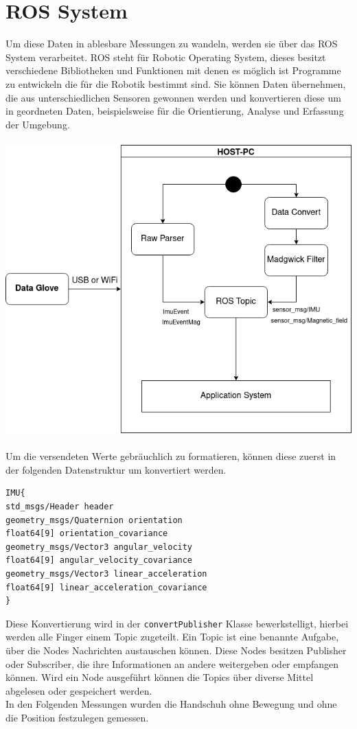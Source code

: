 \section{ROS System}
Um diese Daten in ablesbare Messungen zu wandeln, werden sie über das ROS System verarbeitet. ROS steht für Robotic Operating System, dieses besitzt verschiedene Bibliotheken und Funktionen mit denen es möglich ist Programme zu entwickeln die für die Robotik bestimmt sind. 
Sie können Daten übernehmen, die aus unterschiedlichen Sensoren gewonnen werden und konvertieren diese um in geordneten Daten, beispielsweise für die Orientierung, Analyse und Erfassung der Umgebung. 
\\
\\
\includegraphics[width=0.7\columnwidth]{Bachelorarbeit/images/Host-Architektur.drawio.png}
\\
\\
Um die versendeten Werte gebräuchlich zu formatieren, können diese zuerst in der folgenden Datenstruktur um konvertiert werden. 
\begin{lstlisting}[label=lst:structure]
IMU{
std_msgs/Header header
geometry_msgs/Quaternion orientation
float64[9] orientation_covariance
geometry_msgs/Vector3 angular_velocity
float64[9] angular_velocity_covariance
geometry_msgs/Vector3 linear_acceleration
float64[9] linear_acceleration_covariance
}
\end{lstlisting}
Diese Konvertierung wird in der \lstinline{convertPublisher} Klasse bewerkstelligt, hierbei werden alle Finger einem Topic zugeteilt. Ein Topic ist eine benannte Aufgabe, über die Nodes Nachrichten austauschen können. Diese Nodes besitzen Publisher oder Subscriber, die ihre Informationen an andere weitergeben oder empfangen können. Wird ein Node ausgeführt können die Topics über diverse Mittel abgelesen oder gespeichert werden.
\\
In den Folgenden Messungen wurden die Handschuh ohne Bewegung und ohne die Position festzulegen gemessen. 

